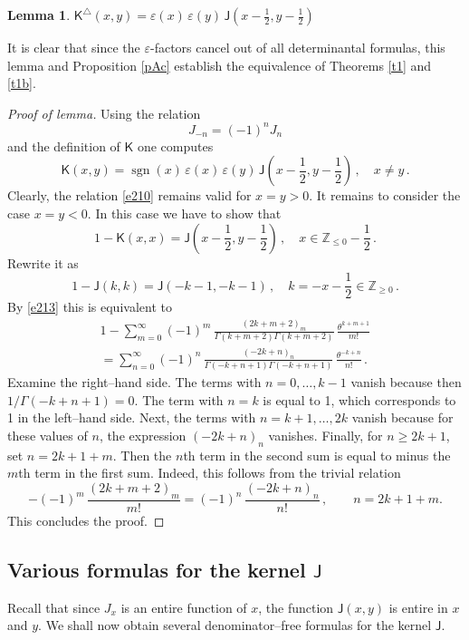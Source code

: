 \documentclass[12pt]{amsart}
\newcommand{\Ga}{\Gamma}
\newcommand{\sgn}{\operatorname{sgn}}
\newcommand{\tri}{\triangle}
\newcommand{\J}{\mathsf{J}}
\newcommand{\Z}{\mathbb{Z}}
\newcommand{\sh}{{\textstyle \frac12}}
\newcommand{\KK}{\mathsf{K}}
\newcommand{\ep}{\varepsilon}
\theoremstyle{plain}
\newtheorem{lemma}{Lemma}[section]
\theoremstyle{definition}
\numberwithin{equation}{section}
\begin{document}
\begin{lemma}\label{l0001} $\KK^\tri(x,y) = \ep(x)\, \ep(y) \, \J(x-\sh,y-\sh)$
\end{lemma}

It is clear that since the $\ep$-factors cancel out of all determinantal
formulas, this lemma and Proposition \ref{pAc} establish  the equivalence
of Theorems \ref{t1} and \ref{t1b}.

\begin{proof}[Proof of lemma]
Using the relation 
$$
J_{-n}=(-1)^n J_n
$$
and the definition of $\KK$ one computes
%
\begin{equation}\label{e210}
\KK(x,y) = \sgn(x)\, \ep(x)\, \ep(y) \, \J(x-\sh,y-\sh)\,, \quad x\ne y\,.
\end{equation}
%
Clearly, the relation \eqref{e210} remains valid for $x=y>0$. It remains
to consider the case $x=y<0$. In this case we have to show that
$$
1-\KK(x,x)=\J(x-\sh,y-\sh)\,, \quad x\in\Z_{\le 0}-\sh \,.
$$
Rewrite it as
%
\begin{equation}\label{e004}
1-\J(k,k)=\J(-k-1,-k-1)\,, \quad k=-x-\sh\in\Z_{\ge 0}\,.
\end{equation}
%
By \eqref{e213} this is equivalent to
%
\begin{multline*}
1-\sum_{m=0}^\infty (-1)^m\,\frac{(2k+m+2)_m}{\Ga(k+m+2)\Ga(k+m+2)}\,
\frac{\theta^{k+m+1}}{m!}\\
=\sum_{n=0}^\infty (-1)^n\,\frac{(-2k+n)_n}{\Ga(-k+n+1)\Ga(-k+n+1)}\,
\frac{\theta^{-k+n}}{n!}\,.
\end{multline*}
%
Examine the right--hand side. The terms with $n=0,\dots,k-1$ vanish
because then $1/\Ga(-k+n+1)=0$. The term with $n=k$ is equal to 1,
which corresponds to 1 in the left--hand side. Next, the terms with
$n=k+1,\dots,2k$ vanish because for these values of $n$, the expression
$(-2k+n)_n$ vanishes. Finally, for $n\ge 2k+1$, set $n=2k+1+m$. Then the
$n$th term in the second sum is equal to minus the $m$th term in the
first sum. Indeed, this follows from the trivial relation 
$$
-(-1)^m\,\frac{(2k+m+2)_m}{m!}=(-1)^n\,\frac{(-2k+n)_n}{n!}\,,
\qquad n=2k+1+m.
$$
This concludes the proof.
\end{proof} 


\subsection{Various formulas for the kernel $\J$}\label{s22}

Recall that since $J_x$ is an entire 
function of $x$, the function $\J(x,y)$ is entire in $x$ and $y$. 
We shall now obtain several denominator--free formulas
for the kernel $\J$. 
\end{document}
